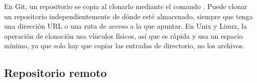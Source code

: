 En Git, un repositorio se copia al clonarlo mediante el comando . Puede
clonar un repositorio independientemente de dónde esté almacenado, siempre que tenga una
dirección URL o una ruta de acceso a la que apuntar. En Unix y Linux, la operación de clonación
usa vínculos físicos, así que es rápida y usa un espacio mínimo, ya que solo hay que copiar las
entradas de directorio, no los archivos.

\subsection*{Repositorio remoto}
